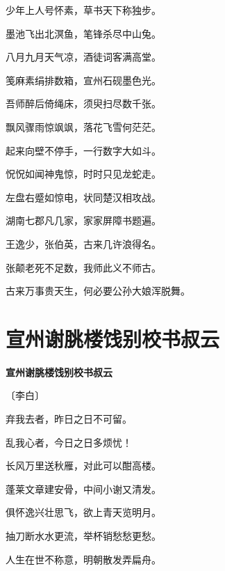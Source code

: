 \documentclass[12pt,UTF-8,openany,fontset=none]{ctexbook}
\begin{document}
\begin{center}
    \begin{Large}

        少年上人号怀素，草书天下称独步。

        墨池飞出北溟鱼，笔锋杀尽中山兔。

        八月九月天气凉，酒徒词客满高堂。

        笺麻素绢排数箱，宣州石砚墨色光。

        吾师醉后倚绳床，须臾扫尽数千张。

        飘风骤雨惊飒飒，落花飞雪何茫茫。

        起来向壁不停手，一行数字大如斗。

        怳怳如闻神鬼惊，时时只见龙蛇走。

        左盘右蹙如惊电，状同楚汉相攻战。

        湖南七郡凡几家，家家屏障书题遍。

        王逸少，张伯英，古来几许浪得名。

        张颠老死不足数，我师此义不师古。

        \hspace{52pt}古来万事贵天生，何必要公孙大娘浑脱舞。

    \end{Large}

\end{center}

\vspace{8pt}
\clearpage

\section{宣州谢朓楼饯别校书叔云}


\begin{center}
    {\bfseries 宣州谢朓楼饯别校书叔云}

    \vspace{18pt}

    \begin{large}\xuwen
        〔李白〕
    \end{large}

\end{center}

    \vspace{18pt}

\begin{center}
    \begin{Large}

        弃我去者，昨日之日不可留。

        乱我心者，今日之日多烦忧！

        长风万里送秋雁，对此可以酣高楼。

        蓬莱文章建安骨，中间小谢又清发。

        俱怀逸兴壮思飞，欲上青天览明月。

        抽刀断水水更流，举杯销愁愁更愁。

        人生在世不称意，明朝散发弄扁舟。

    \end{Large}

\end{center}
\end{document}

